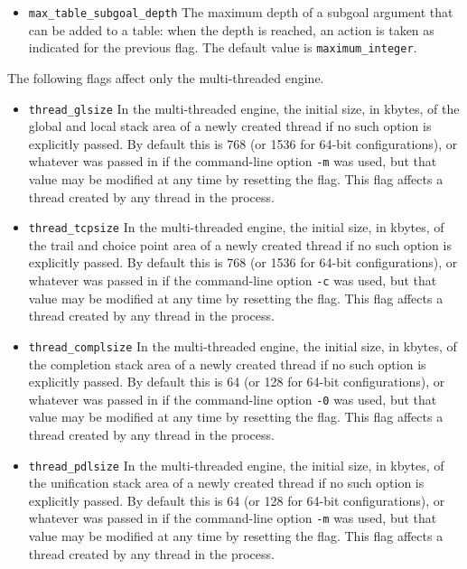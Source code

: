 \begin{description}
\begin{itemize}
\item {\tt max\_table\_subgoal\_depth} The maximum depth of a subgoal
  argument that can be added to a table: when the depth is reached, an
  action is taken as indicated for the previous flag.  The default
  value is {\tt maximum\_integer}.

\end{itemize}

The following flags affect only the multi-threaded engine.

\begin{itemize}
\item {\tt thread\_glsize} In the multi-threaded engine, the initial
  size, in kbytes, of the global and local stack area of a newly
  created thread if no such option is explicitly passed.  By default
  this is 768 (or 1536 for 64-bit configurations), or whatever was
  passed in if the command-line option {\tt -m} was used, but that
  value may be modified at any time by resetting the flag.  This flag
  affects a thread created by any thread in the process.

\item {\tt thread\_tcpsize} In the multi-threaded engine, the initial
  size, in kbytes, of the trail and choice point area of a newly
  created thread if no such option is explicitly passed.  By default
  this is 768 (or 1536 for 64-bit configurations), or whatever was
  passed in if the command-line option {\tt -c} was used, but that
  value may be modified at any time by resetting the flag.  This flag
  affects a thread created by any thread in the process.

\item {\tt thread\_complsize} In the multi-threaded engine, the
  initial size, in kbytes, of the completion stack area of a newly
  created thread if no such option is explicitly passed.  By default
  this is 64 (or 128 for 64-bit configurations), or whatever was
  passed in if the command-line option {\tt -0} was used, but that
  value may be modified at any time by resetting the flag.  This flag
  affects a thread created by any thread in the process.

\item {\tt thread\_pdlsize} In the multi-threaded engine, the initial
  size, in kbytes, of the unification stack area of a newly created
  thread if no such option is explicitly passed.  By default this is
  64 (or 128 for 64-bit configurations), or whatever was passed in if
  the command-line option {\tt -m} was used, but that value may be
  modified at any time by resetting the flag.  This flag affects a
  thread created by any thread in the process.


\end{itemize}
\end{description}
